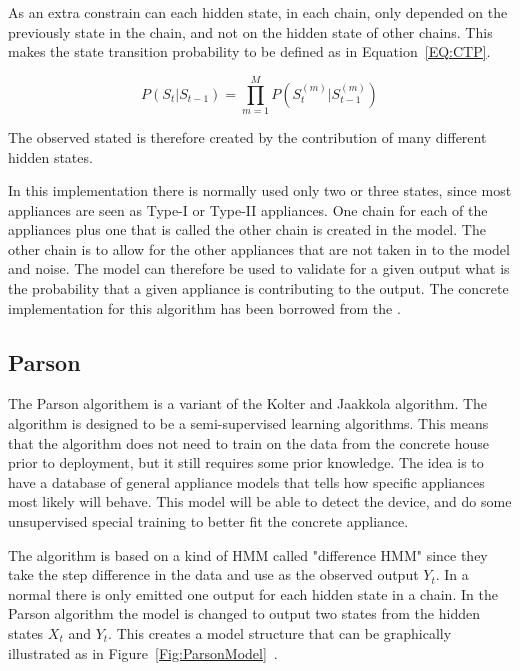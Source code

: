 As an extra constrain can each hidden state, in each chain, only depended on the previously state in the chain, and not on the hidden state of other chains. This makes the state transition probability to be defined as in Equation~\ref{EQ:CTP}. 

\begin{equation}
	P(S_t|S_{t-1}) = \prod_{m = 1}^M P\left( S_t^{(m)}| S_{t-1}^{(m)} \right)
	\label{EQ:CTP}
\end{equation}

The observed stated is therefore created by the contribution of many different hidden states. 

In this implementation there is normally used only two or three states, since most appliances are seen as Type-I or Type-II appliances. One chain for each of the appliances plus one that is called the other chain is created in the model. The other chain is to allow for the other appliances that are not taken in to the model and noise. The model can therefore be used to validate for a given output what is the probability that a given appliance is contributing to the output. The concrete implementation for this algorithm has been borrowed from the  \citep{RefWorks:21}. 

\subsection{Parson}
The Parson algorithem is a variant of the Kolter and Jaakkola algorithm\citep{RefWorks:22}. The algorithm is designed to be a semi-supervised learning algorithms. This means that the algorithm does not need to train on the data from the concrete house prior to deployment, but it still requires some prior knowledge. The idea is to have a database of general appliance models that tells how specific appliances most likely will behave. This model will be able to detect the device, and do some unsupervised special training to better fit the concrete appliance. 

The algorithm is based on a kind of HMM called "difference HMM" since they take the step difference in the data and use as the observed output $Y_t$. In a normal  there is only emitted one output for each hidden state in a chain. In the Parson algorithm the model is changed to output two states from the hidden states $X_t$ and $Y_t$. This creates a model structure that can be graphically illustrated as in Figure~\ref{Fig:ParsonModel}~\citep{RefWorks:28}. 

